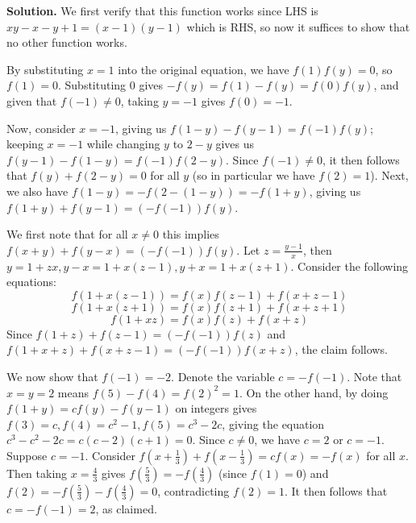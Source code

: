 \documentclass[11pt,a4paper]{article}
\begin{document}
\begin{enumerate}
	\textbf{Solution.} We first verify that this function works since LHS is $xy - x - y + 1 = (x-1)(y-1)$ which is RHS, 
	so now it suffices to show that no other function works. 
	
	By substituting $x = 1$ into the original equation, we have $f(1)f(y)=0$, so $f(1)=0$. 
	Substituting $0$ gives $-f(y)=f(1)-f(y)=f(0)f(y)$, and given that $f(-1)\neq 0$, taking $y=-1$ gives $f(0)=-1$. 
	
	Now, consider $x=-1$, giving us $f(1 - y) - f(y - 1) = f(-1)f(y)$;  keeping $x=-1$ while changing $y$ to $2-y$ gives us $f(y-1)-f(1-y)=f(-1)f(2-y)$. 
	Since $f(-1)\neq 0$, it then follows that $f(y) + f(2 - y) = 0$ for all $y$ (so in particular we have $f(2) = 1$). 
	Next, we also have $f(1 - y) = -f(2 - (1 - y)) = -f(1 + y)$, 
	giving us $f(1 + y) + f(y - 1) = (-f(-1))f(y)$. 
	
	We first note that for all $x\neq 0$ this implies $f(x + y)  +  f(y - x) = (-f(-1))f(y)$. 
	Let $z = \frac{y - 1}{x}$, then $y = 1 + zx, y - x = 1 + x(z - 1), y + x = 1 + x(z + 1)$. 
	Consider the following equations: 
	\[
	f(1 + x(z - 1)) = f(x)f(z - 1) + f(x + z - 1)
	\]
	\[
	f(1 + x(z + 1)) = f(x)f(z + 1) + f(x + z + 1)
	\]
	\[ 
	f(1 + xz) = f(x)f(z) + f(x + z)
	\]
	Since $f(1 + z) + f(z - 1) = (-f(-1))f(z)$ and $f(1 + x + z) + f(x + z - 1) = (-f(-1))f(x + z)$, 
	the claim follows. 
	
	We now show that $f(-1)=-2$. 
	Denote the variable $c = -f(-1)$. 
	Note that $x=y=2$ means $f(5)-f(4)=f(2)^2=1$. 
	On the other hand, by doing $f(1 + y) = cf(y)-f(y-1)$ on integers gives 
	$f(3) = c, f(4) = c^2 - 1, f(5) = c^3-2c$, 
	giving the equation $c^3 - c^2-2c = c(c-2)(c+1)=0$. 
	Since $c\neq 0$, we have $c=2$ or $c=-1$. 
	Suppose $c=-1$. 
	Consider $f(x + \frac 13) + f(x - \frac 13) = cf(x)=-f(x)$ for all $x$. 
	Then taking $x = \frac{4}{3}$ gives $f(\frac 53) = -f(\frac 43)$ (since $f(1)=0$) 
	and $f(2) = -f(\frac 53) - f(\frac 43) = 0$, 
	contradicting $f(2)=1$. 
	It then follows that $c=-f(-1)=2$, as claimed. 
	

\end{enumerate}
\end{document}
